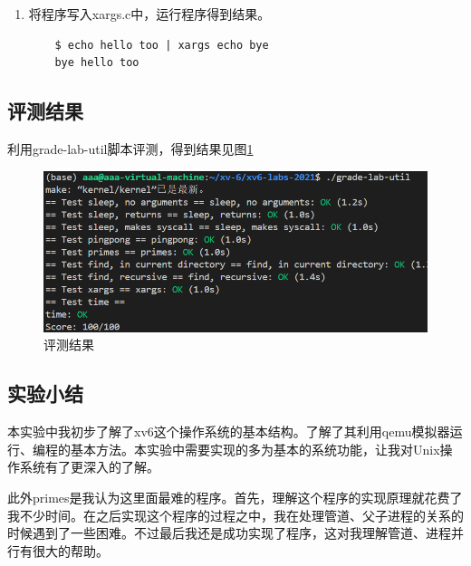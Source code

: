 \begin{enumerate}
\begin{itemize}
\begin{lstlisting}[language=c, title=回车的处理]
    args[arg_count++] = current_line; // 将当前行添加到参数数组
    args[arg_count] = 0;              // 设置参数数组的结束标志

    if (fork()) // 创建子进程
    {
        wait(0);                       // 父进程等待子进程结束
        arg_count = initial_arg_count; // 重置参数数量
    }
    else
    {
        exec(argv[1], args); // 子进程执行命令
    }
            \end{lstlisting}
          \end{itemize}
    \item 将程序写入xargs.c中，运行程序得到结果。
          \begin{lstlisting}
    $ echo hello too | xargs echo bye 
    bye hello too
    \end{lstlisting}
\end{enumerate}

\subsection{评测结果}

利用grade-lab-util脚本评测，得到结果见图\ref{fig:util}
\begin{figure}[h]
    \centering
    \includegraphics[width=\linewidth]{pics/util评测结果.png}
    \caption{评测结果}
    \label{fig:util}
\end{figure}

\subsection{实验小结}
本实验中我初步了解了xv6这个操作系统的基本结构。了解了其利用qemu模拟器运行、编程的基本方法。本实验中需要实现的多为基本的系统功能，让我对Unix操作系统有了更深入的了解。

此外primes是我认为这里面最难的程序。首先，理解这个程序的实现原理就花费了我不少时间。在之后实现这个程序的过程之中，我在处理管道、父子进程的关系的时候遇到了一些困难。不过最后我还是成功实现了程序，这对我理解管道、进程并行有很大的帮助。